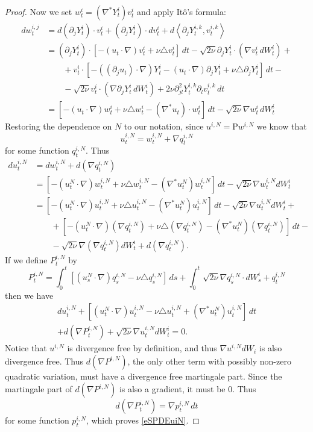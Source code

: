 \documentclass[final]{amsart}%
\newcommand{\del}{\partial}
\newcommand{\lap}{\triangle}
\newcommand{\transpose}{^*}
\newcommand{\grad}{\nabla}
\newcommand{\gradt}{\grad\transpose}
\newcommand{\lhp}{\boldsymbol{\mathrm{P}}}
\newif\iftextstyle
\newcommand{\qv}[2]{\iftextstyle\langle\else\left\langle\fi #1, #2 \iftextstyle\rangle\else\right\rangle\fi}
\numberwithin{equation}{section}
\theoremstyle{definition}
\theoremstyle{remark}
\begin{document}
\begin{proof}
Now we set $w^i_t = (\gradt Y^i_t) v^i_t$ and apply It\^o's formula:
\begin{align*}
  dw^{i,j}_t &= d(\del_j Y^i_t) \cdot v^i_t + (\del_j Y^i_t)\cdot dv^i_t +
  d\qv{\del_j Y^{i,k}_t}{v^{i,k}_t}\\ 
  &= (\del_j Y^i_t) \cdot \left[ -(u_t \cdot \grad) v^i_t + \nu \lap v^i_t
  \right] \, dt - \sqrt{2\nu} \del_j Y^i_t \cdot \left( \grad v^i_t \,
    dW^i_t\right) +\\ 
  &\qquad + v^i_t \cdot \left[ -((\del_j u_t) \cdot \grad) Y^i_t - (u_t \cdot
    \grad) \del_j Y^i_t + \nu \lap \del_j Y^i_t \right] \, dt -\\ 
  &\qquad - \sqrt{2\nu} v^i_t \cdot \left( \grad \del_j Y^i_t \, dW^i_t
  \right) + 2\nu \del^2_{jl} Y^{i,k}_t \del_l v^{i,k}_t \, dt\\ 
  &= \left[ -(u_t\cdot \grad)w^i_t + \nu \lap w^i_t - (\gradt u_t) \cdot w^i_t
  \right]\,dt - \sqrt{2\nu} \grad w^i_t\,dW^i_t
\end{align*}
Restoring the dependence on $N$ to our notation,
since $u^{i,N} = \lhp w^{i,N}$ we know that
$$
u^{i,N}_t = w^{i,N}_t + \grad q^{i,N}_t
$$
for some function $q^{i,N}_t$. Thus
\begin{align*}
  du^{i,N}_t &= dw^{i,N}_t + d(\grad q^{i,N}_t)\\
  &= \left[ -(u^N_t \cdot \grad) w^{i,N}_t + \nu \lap w^{i,N}_t - (\gradt u^N_t) w^{i,N}_t
  \right] \, dt - \sqrt{2\nu} \grad w^{i,N}_t dW^i_t\\ 
  &= \left[ -(u^N_t \cdot \grad) u^{i,N}_t + \nu \lap u^{i,N}_t - (\gradt u^N_t) u^{i,N}_t
  \right] \, dt - \sqrt{2\nu} \grad u^{i,N}_t dW^i_t +\\ 
  &\qquad +\left[ -(u^N_t \cdot \grad) (\grad q^{i,N}_t) + \nu \lap (\grad q^{i,N}_t)
    - (\gradt u^N_t) (\grad q^{i,N}_t) \right] \, dt -\\ 
  &\qquad - \sqrt{2\nu} \grad (\grad q^{i,N}_t) dW^i_t + d(\grad q^{i,N}_t). 
\end{align*}
If we define $P^{i,N}_t$ by
$$
P^{i,N}_t = \int_0^t \left[ (u^N_s \cdot \grad) q^{i,N}_s - \nu \lap
  q^{i,N}_s\right] \, ds + \int_0^t \sqrt{2\nu} \grad q^{i,N}_s \cdot dW^i_s +
q^{i,N}_t
$$
then we have
\begin{multline}\label{eDui}
  du^{i,N}_t + \left[ (u^N_t \cdot \grad) u^{i,N}_t - \nu \lap u^{i,N}_t + (\gradt u^N_t) u^{i,N}_t
  \right] \, dt \\+ d(\grad P^{i,N}_t) + \sqrt{2\nu} \grad u^{i,N}_t dW^i_t = 0. 
\end{multline}
Notice that $u^{i,N}$ is divergence free by definition, and thus  $\grad
u^{i,N} dW_i$ is also divergence free. Thus $d(\grad P^{i,N})$, the
only other term with possibly non-zero quadratic variation, must have a divergence free martingale part. Since the martingale part of $d(\grad P^{i,N})$ is also a gradient, it must be $0$. Thus
\begin{equation*}
  d(\grad P^{i,N}_t) = \grad p^{i,N}_t \, dt
\end{equation*}
for some function $p^{i,N}_t$, which proves \eqref{eSPDEuiN}.


\end{proof}
\end{document}
